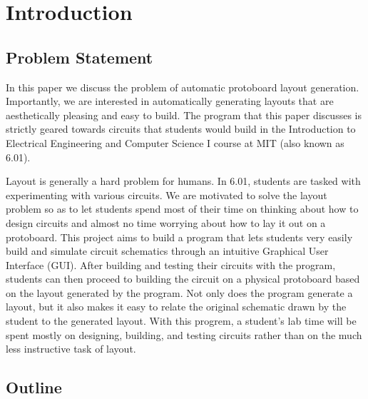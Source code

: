 

\chapter{Introduction}
\label{ch:intro}

\section{Problem Statement}

In this paper we discuss the problem of automatic protoboard layout generation.
Importantly, we are interested in automatically generating layouts that are
aesthetically pleasing and easy to build. The program that this paper discusses
is strictly geared towards circuits that students would build in the
Introduction to Electrical Engineering and Computer Science I course at MIT (also known as 6.01).

Layout is generally a hard problem for humans. In 6.01, students are tasked with
experimenting with various circuits. We are motivated to solve the layout
problem so as to let students spend most of their time on thinking about how to
design
circuits and almost no time worrying about how to lay it out on a protoboard.
This project aims to build a program that lets students very easily build and
simulate circuit schematics through an intuitive Graphical User Interface (GUI).
After building and testing their circuits with the program, students can then
proceed to building the circuit on a physical protoboard based on the layout
generated by the program. Not only does the program generate a layout, but it
also makes it easy to relate the original schematic drawn by the student to the
generated layout. With this progrem, a student's lab time will be spent mostly
on designing, building, and testing circuits rather than on the much less
instructive task of layout.

\section{Outline}

